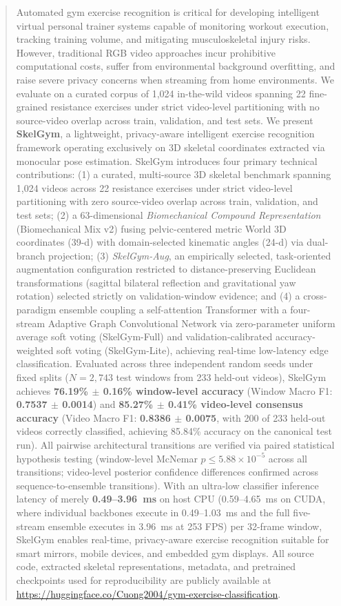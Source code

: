 \documentclass[runningheads]{llncs}
\begin{document}
\begin{abstract}
Automated gym exercise recognition is critical for developing intelligent virtual personal trainer systems capable of monitoring workout execution, tracking training volume, and mitigating musculoskeletal injury risks. However, traditional RGB video approaches incur prohibitive computational costs, suffer from environmental background overfitting, and raise severe privacy concerns when streaming from home environments. We evaluate on a curated corpus of 1,024 in-the-wild videos spanning 22 fine-grained resistance exercises under strict video-level partitioning with no source-video overlap across train, validation, and test sets. We present \textbf{SkelGym}, a lightweight, privacy-aware intelligent exercise recognition framework operating exclusively on 3D skeletal coordinates extracted via monocular pose estimation. SkelGym introduces four primary technical contributions: (1) a curated, multi-source 3D skeletal benchmark spanning 1,024 videos across 22 resistance exercises under strict video-level partitioning with zero source-video overlap across train, validation, and test sets; (2) a 63-dimensional \textit{Biomechanical Compound Representation} (Biomechanical Mix v2) fusing pelvic-centered metric World 3D coordinates (39-d) with domain-selected kinematic angles (24-d) via dual-branch projection; (3) \textit{SkelGym-Aug}, an empirically selected, task-oriented augmentation configuration restricted to distance-preserving Euclidean transformations (sagittal bilateral reflection and gravitational yaw rotation) selected strictly on validation-window evidence; and (4) a cross-paradigm ensemble coupling a self-attention Transformer with a four-stream Adaptive Graph Convolutional Network via zero-parameter uniform average soft voting (SkelGym-Full) and validation-calibrated accuracy-weighted soft voting (SkelGym-Lite), achieving real-time low-latency edge classification. Evaluated across three independent random seeds under fixed splits ($N=2,743$ test windows from 233 held-out videos), SkelGym achieves \textbf{76.19\% $\pm$ 0.16\% window-level accuracy} (Window Macro F1: \textbf{0.7537 $\pm$ 0.0014}) and \textbf{85.27\% $\pm$ 0.41\% video-level consensus accuracy} (Video Macro F1: \textbf{0.8386 $\pm$ 0.0075}, with 200 of 233 held-out videos correctly classified, achieving 85.84\% accuracy on the canonical test run). All pairwise architectural transitions are verified via paired statistical hypothesis testing (window-level McNemar $p \le 5.88 \times 10^{-5}$ across all transitions; video-level posterior confidence differences confirmed across sequence-to-ensemble transitions). With an ultra-low classifier inference latency of merely \textbf{0.49--3.96~ms} on host CPU (0.59--4.65~ms on CUDA, where individual backbones execute in 0.49--1.03~ms and the full five-stream ensemble executes in 3.96~ms at 253 FPS) per 32-frame window, SkelGym enables real-time, privacy-aware exercise recognition suitable for smart mirrors, mobile devices, and embedded gym displays. All source code, extracted skeletal representations, metadata, and pretrained checkpoints used for reproducibility are publicly available at \url{https://huggingface.co/Cuong2004/gym-exercise-classification}.


\end{abstract}
\end{document}
